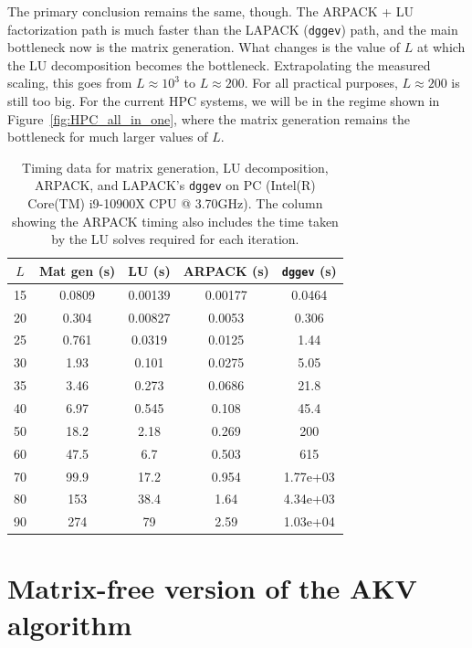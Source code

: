 \documentclass{iopjournal}
\begin{document}
The primary conclusion remains the same, though. The ARPACK + LU factorization path is much faster than the LAPACK (\texttt{dggev}) path, and the main bottleneck now is the matrix generation. What changes is the value of $L$ at which the LU decomposition becomes the bottleneck. Extrapolating the measured scaling, this goes from $L\approx 10^3$ to $L \approx 200$. For all practical purposes, $L \approx 200$ is still too big. For the current HPC systems, we will be in the regime shown in Figure~\ref{fig:HPC_all_in_one}, where the matrix generation remains the bottleneck for much larger values of $L$.

\begin{table}[h]
\centering
\begin{tabular}{c c c c c}
\toprule
$L$ & Mat gen (s) & LU (s) & ARPACK (s) & \texttt{dggev} (s) \\
\midrule
15 & 0.0809 & 0.00139 & 0.00177 & 0.0464 \\
20 & 0.304 & 0.00827 & 0.0053 & 0.306 \\
25 & 0.761 & 0.0319 & 0.0125 & 1.44 \\
30 & 1.93 & 0.101 & 0.0275 & 5.05 \\
35 & 3.46 & 0.273 & 0.0686 & 21.8 \\
40 & 6.97 & 0.545 & 0.108 & 45.4 \\
50 & 18.2 & 2.18 & 0.269 & 200 \\
60 & 47.5 & 6.7 & 0.503 & 615 \\
70 & 99.9 & 17.2 & 0.954 & 1.77e+03 \\
80 & 153 & 38.4 & 1.64 & 4.34e+03 \\
90 & 274 & 79 & 2.59 & 1.03e+04 \\
\bottomrule
\end{tabular}
\caption{Timing data for matrix generation, LU decomposition, ARPACK, and LAPACK's \texttt{dggev} on PC (Intel(R) Core(TM) i9-10900X CPU @ 3.70GHz).  The column showing the ARPACK timing also includes the time taken by the LU solves required for each iteration.}
\label{table:timing_data_PC}
\end{table}

\section{\label{sec:Matrix-free version of the AKV algorithm} Matrix-free version of the AKV algorithm}
\end{document}

